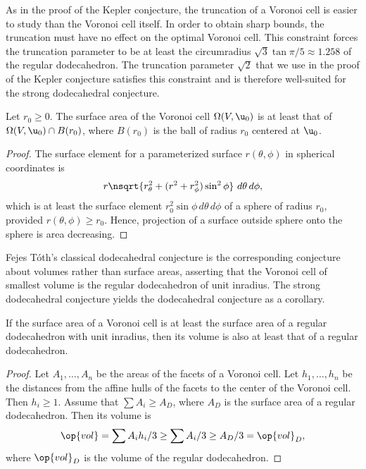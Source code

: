 \begin{remark}
As in the proof of the Kepler conjecture, the truncation of a Voronoi cell is easier
to study than the Voronoi cell itself.  In order to obtain sharp bounds, the truncation
must have no effect on the optimal Voronoi cell.  This constraint forces the
 truncation parameter to be at least
the circumradius $\sqrt{3}\tan{\pi/5}\approx 1.258$ of the regular dodecahedron.   The truncation parameter $\sqrt{2}$
that we use in the proof of the Kepler conjecture satisfies this constraint and is
therefore  well-suited for the strong dodecahedral
conjecture.
\end{remark}

\begin{lemma}[] Let $r_0\ge0$.  %
  The surface area of the Voronoi cell $\Omega(V, \u_0)$ is at least
  that of $\Omega(V, \u_0)\cap B(r_0)$, where $B(r_0)$ is the ball of radius
  $r_0$ centered at $ \u_0$.  
\end{lemma}
%


\begin{proof} The surface element for a parameterized surface
  $r(\theta,\phi)$ in spherical coordinates is
\[
%
  r \nsqrt{r_\theta^2 + (r^2 + r_\phi^2)\sin^2\phi } \,\,d\theta\,d\phi,
\]
which is at least the surface element $r_0^2 \sin\phi\, d\theta\,d\phi$
of a sphere of radius $r_0$, provided
$r(\theta,\phi)\ge r_0$.   Hence, projection of a surface outside
sphere onto the sphere is area decreasing.
\end{proof}


Fejes T\'oth's classical dodecahedral conjecture is the corresponding conjecture
about volumes rather than surface areas, asserting that  the
Voronoi cell of smallest volume is the regular dodecahedron of
unit inradius.  %
The strong dodecahedral conjecture yields the dodecahedral conjecture
as a corollary.

\begin{lemma}[]
  If the surface area of a Voronoi cell is at least the surface area
  of a regular dodecahedron with unit inradius, then its volume is also
   at least that  of a regular dodecahedron.
\end{lemma}

\begin{proof} Let $A_1,\ldots,A_n$ be the areas of the facets of a
  Voronoi cell.  Let $h_1,\ldots,h_n$ be the distances from the affine
  hulls of the facets to the center of the Voronoi cell.  Then $h_i\ge
  1$.  Assume that $\sum A_i \ge A_D$, where $A_D$ is the surface area
  of a regular dodecahedron.  Then its volume is
\[
\op{vol} = \sum A_i h_i/3 \ge \sum A_i/3 \ge A_D/3 = \op{vol}_D,
\]
where $\op{vol}_D$ is the volume of the regular dodecahedron.
\end{proof}
%
%
%


